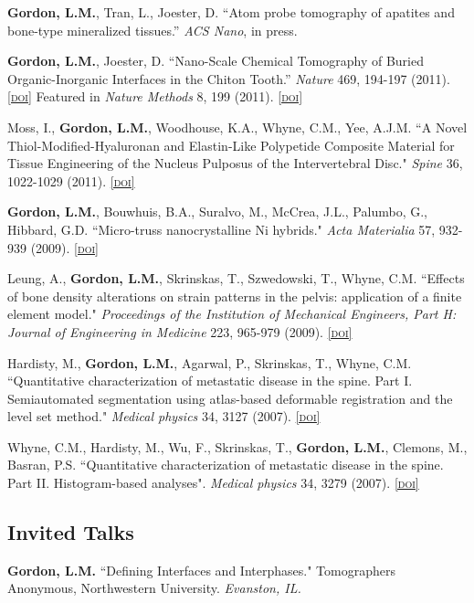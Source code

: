 \textbf{Gordon, L.M.}, Tran, L., Joester, D. “Atom probe tomography of apatites and bone-type mineralized tissues.” \emph{ACS Nano}, in press.

\textbf{Gordon, L.M.}, Joester, D. “Nano-Scale Chemical Tomography of Buried Organic-Inorganic Interfaces in the Chiton Tooth.” \emph{Nature} 469, 194-197 (2011). \href{http://dx.doi.org/10.1038/nature09686}{\textsc{\footnotesize{[doi]}}} Featured in \emph{Nature Methods} 8, 199 (2011). \href{http://dx.doi.org/10.1038/nmeth0311-199}{\textsc{\footnotesize{[doi]}}}

Moss, I., \textbf{Gordon, L.M.}, Woodhouse, K.A., Whyne, C.M., Yee, A.J.M. ``A Novel Thiol-Modified-Hyaluronan and Elastin-Like Polypetide Composite Material for Tissue Engineering of the Nucleus Pulposus of the Intervertebral Disc." \emph{Spine} 36, 1022-1029 (2011). \href{http://dx.doi.org/10.1097/BRS.0b013e3181e7b705}{\textsc{\footnotesize{[doi]}}}

\textbf{Gordon, L.M.}, Bouwhuis, B.A., Suralvo, M., McCrea, J.L., Palumbo, G., Hibbard, G.D. ``Micro-truss nanocrystalline Ni hybrids." \emph{Acta Materialia} 57, 932-939 (2009). \href{http://dx.doi.org/10.1016/j.actamat.2008.10.038}{\textsc{\footnotesize{[doi]}}}

Leung, A., \textbf{Gordon, L.M.}, Skrinskas, T., Szwedowski, T., Whyne, C.M. ``Effects of bone density alterations on strain patterns in the pelvis: application of a finite element model." \emph{Proceedings of the Institution of Mechanical Engineers, Part H: Journal of Engineering in Medicine} 223, 965-979 (2009). \href{http://dx.doi.org/10.1243/09544119JEIM618}{\textsc{\footnotesize{[doi]}}}

Hardisty, M., \textbf{Gordon, L.M.}, Agarwal, P., Skrinskas, T., Whyne, C.M. ``Quantitative characterization of metastatic disease in the spine. Part I. Semiautomated segmentation using atlas-based deformable registration and the level set method." \emph{Medical physics} 34, 3127 (2007). \href{http://dx.doi.org/10.1118/1.2746498}{\textsc{\footnotesize{[doi]}}}

Whyne, C.M., Hardisty, M., Wu, F., Skrinskas, T., \textbf{Gordon, L.M.}, Clemons, M., Basran, P.S. ``Quantitative characterization of metastatic disease in the spine. Part II. Histogram-based analyses". \emph{Medical physics} 34, 3279 (2007). \href{http://dx.doi.org/10.1118/1.2756939}{\textsc{\footnotesize{[doi]}}}
\endgroup

\subsection*{Invited Talks}
\textbf{Gordon, L.M.} ``Defining Interfaces and Interphases." Tomographers Anonymous, Northwestern University. \emph{Evanston, IL.}

